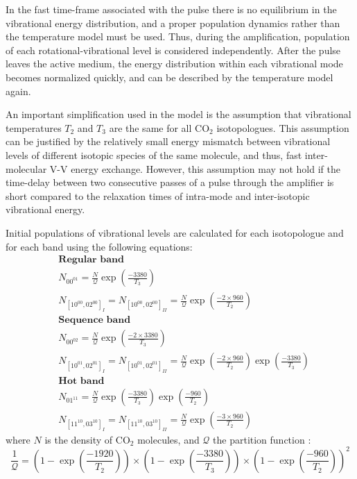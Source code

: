 \documentclass{report}
\begin{document}
In the fast time-frame associated with the pulse there is no equilibrium in the vibrational energy distribution, and a proper population dynamics rather than the temperature model must be used. Thus, during the amplification, population of each rotational-vibrational level is considered independently. After the pulse leaves the active medium, the energy distribution within each vibrational mode becomes normalized quickly, and can be described by the temperature model again.

An important simplification used in the model is the assumption that vibrational temperatures $T_2$ and $T_3$ are the same for all {CO$_2$} isotopologues. This assumption can be justified by the relatively small energy mismatch between vibrational levels of different isotopic species of the same molecule, and thus, fast inter-molecular V-V energy exchange. However, this assumption may not hold if the time-delay between two consecutive passes of a pulse through the amplifier is short compared to the relaxation times of intra-mode and inter-isotopic vibrational energy.

Initial populations of vibrational levels are calculated for each isotopologue and for each band using the following equations:
\begin{equation}\label{eq:Boltzman}
\begin{aligned}
&\textbf{Regular band}\\
&N_{00^01}     =  \frac{N}{\mathcal{Q}}  \exp\left(\frac{-3380}{T_3}\right)\\
&N_{[10^00,02^00]_I}  = N_{[10^00,02^00]_{II}}  =  \frac{N}{\mathcal{Q}} \exp\left(\frac{-2\times 960}{T_2}\right)\\
&\textbf{Sequence band}\\
&N_{00^02}     =  \frac{N}{\mathcal{Q}}  \exp\left(\frac{-2\times 3380}{T_3}\right)\\
&N_{[10^01,02^01]_I}  =  N_{[10^01,02^01]_{II}} =  \frac{N}{\mathcal{Q}} \exp\left(\frac{-2\times 960}{T_2}\right) \exp\left(\frac{-3380}{T_3}\right)\\
&\textbf{Hot band}\\
&N_{01^11}     =  \frac{N}{\mathcal{Q}} \exp\left(\frac{-3380}{T_3}\right) \exp\left(\frac{-960}{T_2}\right)\\
&N_{[11^10,03^10]_I}  = N_{[11^10,03^10]_{II}} =   \frac{N}{\mathcal{Q}} \exp\left(\frac{-3\times 960}{T_2}\right)
\end{aligned}
\end{equation}
where $N$ is the density of {CO$_2$} molecules, and $\mathcal{Q}$ the partition function \cite{Witteman-1987}:
\begin{equation}
\frac{1}{\mathcal{Q}} = \left(1-\exp\left(\frac{-1920}{T_2}\right)\right) \times \left(1-\exp\left(\frac{-3380}{T_3}\right)\right) \times \left(1-\exp\left(\frac{-960}{T_2}\right)\right)^2
\end{equation}
\end{document}
